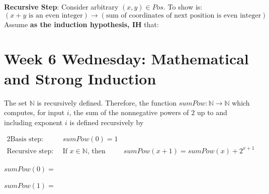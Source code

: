 \documentclass[12pt, oneside]{article}
\begin{document}
\vspace{100pt}


{\bf Recursive Step}:  Consider arbitrary $(x,y) \in Pos$.  To show is:
\[
(x+y \text{ is an even integer}) \to (\text{sum of coordinates of next position is even integer})
\]
Assume {\bf as the induction hypothesis, IH} that: 


\vspace{400pt} 
\newpage

\section*{Week 6 Wednesday: Mathematical and Strong Induction}



The set $\mathbb{N}$ is recursively defined.
Therefore, the function $sumPow: \mathbb{N} \to \mathbb{N}$
which computes, for input $i$, the sum of the nonnegative powers of $2$
up to and including exponent $i$ is defined
recursively by

\begin{alignat*}{2}
    \text{Basis step:  } \qquad & sumPow(0) = 1 &\\
    \text{Recursive step:  } & \text{If } x \in \mathbb{N} \text{, then } &sumPow(x+1) = sumPow(x) + 2^{x+1}
\end{alignat*}

$sumPow(0) =$

\vspace{20pt}

$sumPow(1) =$

\vspace{20pt}
\end{document}
